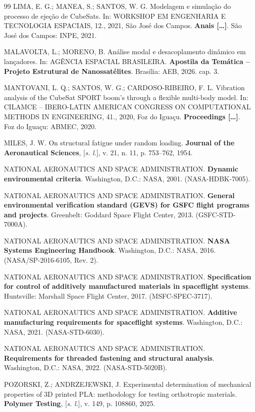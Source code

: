\begin{thebibliography}{99}
LIMA, E. G.; MANEA, S.; SANTOS, W. G. Modelagem e simulação do processo de ejeção de CubeSats. In: WORKSHOP EM ENGENHARIA E TECNOLOGIA ESPACIAIS, 12., 2021, São José dos Campos. \textbf{Anais [\ldots]}. São José dos Campos: INPE, 2021.

MALAVOLTA, L.; MORENO, B. Análise modal e desacoplamento dinâmico em lançadores. In: AGÊNCIA ESPACIAL BRASILEIRA. \textbf{Apostila da Temática -- Projeto Estrutural de Nanossatélites}. Brasília: AEB, 2026. cap. 3.

MANTOVANI, L. Q.; SANTOS, W. G.; CARDOSO-RIBEIRO, F. L. Vibration analysis of the CubeSat SPORT boom's through a flexible multi-body model. In: CILAMCE -- IBERO-LATIN AMERICAN CONGRESS ON COMPUTATIONAL METHODS IN ENGINEERING, 41., 2020, Foz do Iguaçu. \textbf{Proceedings [\ldots]}. Foz do Iguaçu: ABMEC, 2020.

MILES, J. W. On structural fatigue under random loading. \textbf{Journal of the Aeronautical Sciences}, [\textit{s. l.}], v. 21, n. 11, p. 753--762, 1954.

NATIONAL AERONAUTICS AND SPACE ADMINISTRATION. \textbf{Dynamic environmental criteria}. Washington, D.C.: NASA, 2001. (NASA-HDBK-7005).

NATIONAL AERONAUTICS AND SPACE ADMINISTRATION. \textbf{General environmental verification standard (GEVS) for GSFC flight programs and projects}. Greenbelt: Goddard Space Flight Center, 2013. (GSFC-STD-7000A).

NATIONAL AERONAUTICS AND SPACE ADMINISTRATION. \textbf{NASA Systems Engineering Handbook}. Washington, D.C.: NASA, 2016. (NASA/SP-2016-6105, Rev. 2).

NATIONAL AERONAUTICS AND SPACE ADMINISTRATION. \textbf{Specification for control of additively manufactured materials in spaceflight systems}. Huntsville: Marshall Space Flight Center, 2017. (MSFC-SPEC-3717).

NATIONAL AERONAUTICS AND SPACE ADMINISTRATION. \textbf{Additive manufacturing requirements for spaceflight systems}. Washington, D.C.: NASA, 2021. (NASA-STD-6030).

NATIONAL AERONAUTICS AND SPACE ADMINISTRATION. \textbf{Requirements for threaded fastening and structural analysis}. Washington, D.C.: NASA, 2022. (NASA-STD-5020B).

POZORSKI, Z.; ANDRZEJEWSKI, J. Experimental determination of mechanical properties of 3D printed PLA: methodology for testing orthotropic materials. \textbf{Polymer Testing}, [\textit{s. l.}], v. 149, p. 108860, 2025.


\end{thebibliography}
